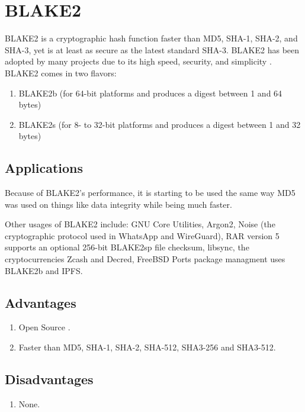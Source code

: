 \documentclass[]{article}
\begin{document}
\section{BLAKE2}
BLAKE2 is a cryptographic hash function faster than MD5, SHA-1, SHA-2, and SHA-3, yet is at least as secure as the latest standard SHA-3. BLAKE2 has been adopted by many projects due to its high speed, security, and simplicity \cite{BLAKE2}. BLAKE2 comes in two flavors:
\begin{enumerate}
	\item BLAKE2b (for 64-bit platforms and produces a digest between 1 and 64 bytes)
	\item BLAKE2s (for 8- to 32-bit platforms and produces a digest between 1 and 32 bytes)
\end{enumerate}

\subsection{Applications}
Because of BLAKE2's performance, it is starting to be used the same way MD5 was used on things like data integrity while being much faster. 

\par Other usages of BLAKE2 include: GNU Core Utilities, Argon2, Noise (the cryptographic protocol used in WhatsApp and WireGuard), RAR version 5 supports an optional 256-bit BLAKE2sp file checksum, libsync, the cryptocurrencies Zcash and Decred, FreeBSD Ports package managment uses BLAKE2b and IPFS.

\subsection{Advantages}
\begin{enumerate}
	\item Open Source \cite{KeccakTeam}.
	\item Faster than MD5, SHA-1, SHA-2, SHA-512, SHA3-256 and SHA3-512\cite{aumassonBLAKE2SimplerSmaller2013}.
\end{enumerate}

\subsection{Disadvantages}
\begin{enumerate}
	\item None.
\end{enumerate}

		
\newpage
\printbibliography
 
\end{document}
